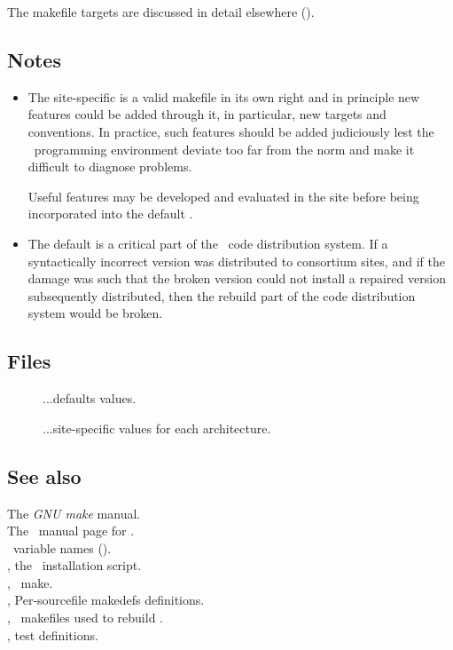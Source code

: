 \noindent
The makefile targets are discussed in detail elsewhere ().

\subsection*{Notes}

\begin{itemize}
\item
   The site-specific  is a valid makefile in its own right and
   in principle new features could be added through it, in particular, new
   targets and conventions.  In practice, such features should be added
   judiciously lest the \aipspp\ programming environment deviate too far
   from the norm and make it difficult to diagnose problems.

   Useful features may be developed and evaluated in the site 
   before being incorporated into the default .

\item
   The default  is a critical part of the \aipspp\ code
   distribution system.  If a syntactically incorrect version was distributed
   to consortium sites, and if the damage was such that the broken version
   could not install a repaired version subsequently distributed, then the
   rebuild part of the code distribution system would be broken.
\end{itemize}

\subsection*{Files}

\begin{description}
\item[]
...defaults values.

\item[]
...site-specific values for each architecture.
\end{description}

\subsection*{See also}

The \textit{GNU make} manual.\\
The \gnu\ manual page for .\\
\aipspp\ variable names ().\\
, the \aipspp\ installation script.\\
, \gnu\ make.\\
, Per-sourcefile makedefs definitions.\\
, \gnu\ makefiles used to rebuild \aipspp.\\
, test  definitions.

